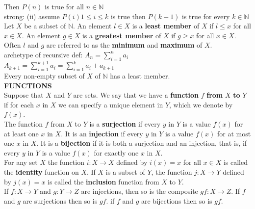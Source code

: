 \documentclass[10pt,landscape]{article}
\begin{document}
\begin{multicols}{4}
Then $P(n)$ is true for all $n \in \mathbb{N}$\\

strong: (ii) assume $P(i) 1 \leq i \leq k$ is true then $P(k+1)$ is
true for every $k \in \mathbb{N}$\\ 

Let $X$ be a subset of $\mathbb{N}$. An element $l \in X$ is a
\textbf{least member} of $X$ if $l \leq x$ for all $x \in X$. An
element $g \in X$ is a \textbf{greatest member} of $X$ if $g \geq x$
for all $x \in X$. Often $l$ and $g$ are referred to as the
\textbf{minimum} and \textbf{maximum} of $X$.\\ 

archetype of recursive def: $A_{n} =
\displaystyle\sum_{i=1}^{n}a_{i}$\\ 

$A_{k+1}=\displaystyle\sum_{i =
  1}^{k+1}a_{i}=\displaystyle\sum_{i=1}^k{}a_{i}+a_{k+1}$\\ 

Every non-empty subset of $X$ of $\mathbb{N}$ has a least member.\\ 

\textbf{FUNCTIONS}\\
Suppose that $X$ and $Y$ are sets. We say that we have a
\textbf{function} $f$ \textbf{from} $X$ \textbf{to} $Y$ if for each
$x$ in $X$ we can specify a unique element in $Y$, which we denote by
$f(x)$.\\ 

The function $f$ from $X$ to $Y$ is a \textbf{surjection} if every $y$
in $Y$ is a value $f(x)$ for at least one $x$ in $X$. It is an
\textbf{injection} if every $y$ in $Y$ is a value $f(x)$ for at most
one $x$ in $X$. It is a \textbf{bijection} if it is both a surjection
and an injection, that is, if every $y$ in $Y$ is a value $f(x)$ for
exactly one $x$ in $X$.\\ 

For any set $X$ the function $i : X \to X$ defined by $i(x) = x$ for
all $x \in X$ is called the \textbf{identity} function on $X$. If $X$
is a subset of $Y$, the function $j : X \to Y$ defined by $j(x) = x$
is called the \textbf{inclusion} function from $X$ to $Y$.\\ 

If $f : X \to Y$ and $g : Y \to Z$ are injections, then so is the
composite $gf : X \to Z$. If $f$ and $g$ are surjections then so is
$gf$. if $f$ and $g$ are bijections then so is $gf$.\\ 


\end{multicols}
\end{document}
